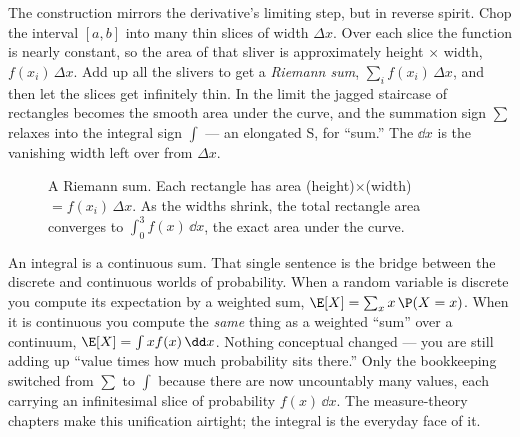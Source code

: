 The construction mirrors the derivative's limiting step, but in reverse spirit. Chop the interval
$[a,b]$ into many thin slices of width $\Delta x$. Over each slice the function is nearly constant, so
the area of that sliver is approximately height $\times$ width, $f(x_i)\,\Delta x$. Add up all the
slivers to get a \emph{Riemann sum}, $\sum_i f(x_i)\,\Delta x$, and then let the slices get
infinitely thin. In the limit the jagged staircase of rectangles becomes the smooth area under the
curve, and the summation sign $\sum$ relaxes into the integral sign $\int$ --- an elongated S, for
``sum.'' The $\dd x$ is the vanishing width left over from $\Delta x$.

\begin{figure}[H]
\centering
{}
\caption{A Riemann sum. Each rectangle has area (height)$\times$(width)$=f(x_i)\,\Delta x$. As the
widths shrink, the total rectangle area converges to $\int_0^3 f(x)\,\dd x$, the exact area under the
curve.}
\label{chAcla:fig-riemann}
\end{figure}

\begin{happeningbox}
An integral is a continuous sum. That single sentence is the bridge between the discrete and
continuous worlds of probability. When a random variable is discrete you compute its expectation by a
weighted sum, $\E[X]=\sum_x x\,\P(X=x)$. When it is continuous you compute the \emph{same} thing as a
weighted ``sum'' over a continuum, $\E[X]=\int x f(x)\,\dd x$. Nothing conceptual changed --- you are
still adding up ``value times how much probability sits there.'' Only the bookkeeping switched from
$\sum$ to $\int$ because there are now uncountably many values, each carrying an infinitesimal slice
of probability $f(x)\,\dd x$. The measure-theory chapters make this unification airtight; the integral
is the everyday face of it.
\end{happeningbox}

